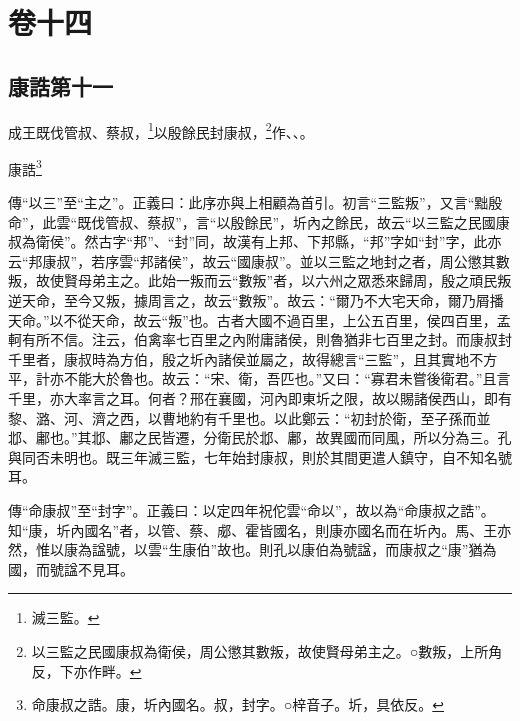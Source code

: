 

\chapter{卷十四}


\section{康誥第十一}


成王既伐管叔、蔡叔，\footnote{滅三監。}以殷餘民封康叔，\footnote{以三監之民國康叔為衛侯，周公懲其數叛，故使賢母弟主之。○數叛，上所角反，下亦作畔。}作、、。

康誥\footnote{命康叔之誥。康，圻內國名。叔，封字。○梓音子。圻，具依反。}


{\noindent\zhuan{}\fzbyks 傳“以三”至“主之”。正義曰：此序亦與上相顧為首引。初言“三監叛”，又言“黜殷命”，此雲“既伐管叔、蔡叔”，言“以殷餘民”，圻內之餘民，故云“以三監之民國康叔為衛侯”。然古字“邦”、“封”同，故漢有上邦、下邦縣，“邦”字如“封”字，此亦云“邦康叔”，若序雲“邦諸侯”，故云“國康叔”。並以三監之地封之者，周公懲其數叛，故使賢母弟主之。此始一叛而云“數叛”者，以六州之眾悉來歸周，殷之頑民叛逆天命，至今又叛，據周言之，故云“數叛”。故云：“爾乃不大宅天命，爾乃屑播天命。”以不從天命，故云“叛”也。古者大國不過百里，上公五百里，侯四百里，孟軻有所不信。注云，伯禽率七百里之內附庸諸侯，則魯猶非七百里之封。而康叔封千里者，康叔時為方伯，殷之圻內諸侯並屬之，故得總言“三監”，且其實地不方平，計亦不能大於魯也。故云：“宋、衛，吾匹也。”又曰：“寡君未嘗後衛君。”且言千里，亦大率言之耳。何者？邢在襄國，河內即東圻之限，故以賜諸侯西山，即有黎、潞、河、濟之西，以曹地約有千里也。以此鄭云：“初封於衛，至子孫而並邶、鄘也。”其邶、鄘之民皆遷，分衛民於邶、鄘，故異國而同風，所以分為三。孔與同否未明也。既三年滅三監，七年始封康叔，則於其間更遣人鎮守，自不知名號耳。 \par}

{\noindent\zhuan{}\fzbyks 傳“命康叔”至“封字”。正義曰：以定四年祝佗雲“命以”，故以為“命康叔之誥”。知“康，圻內國名”者，以管、蔡、郕、霍皆國名，則康亦國名而在圻內。馬、王亦然，惟以康為諡號，以雲“生康伯”故也。則孔以康伯為號諡，而康叔之“康”猶為國，而號諡不見耳。 \par}

